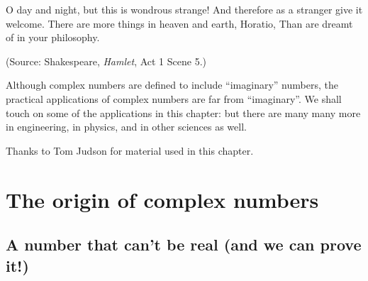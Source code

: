 


\begin{dialogue}
 O day and night, but this is wondrous strange!
 And therefore as a stranger give it welcome.
There are more things in heaven and earth, Horatio,
Than are dreamt of in your philosophy.
\noindent
\end{dialogue}
(Source: Shakespeare, \emph{Hamlet}, Act 1 Scene 5.)
\bigskip

\bigskip

Although complex numbers are defined to include ``imaginary'' numbers, the practical applications of complex numbers are far from ``imaginary''.  We shall touch on some of the applications in this chapter: but there are many many more in engineering, in physics, and in other sciences as well.
\medskip

Thanks to Tom Judson for material used in this chapter.

\section{The origin of complex numbers\quad{}}
\label{sec:ComplexNumbers:Origin}

\subsection{A number that can't be real (and we can prove it!)}

